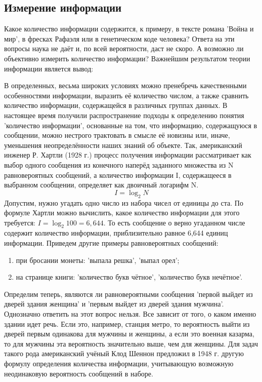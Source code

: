 \documentclass[a4paper]{article}
\begin{document}
\subsection{Измерение информации}

Какое количество информации содержится, к примеру, в тексте романа 'Война и мир', в фресках Рафаэля или в генетическом коде человека? Ответа на эти вопросы наука не даёт и, по всей вероятности, даст не скоро. А возможно ли объективно измерить количество информации? Важнейшим результатом теории информации является вывод:

В определенных, весьма широких условиях можно пренебречь качественными особенностями информации, выразить её количество числом, а также сравнить количество информации, содержащейся в различных группах данных. В настоящее время получили распространение подходы к определению понятия 'количество информации', основанные на том, что информацию, содержащуюся в сообщении, можно нестрого трактовать в смысле её новизны или, иначе, уменьшения неопределённости наших знаний об объекте.
Так, американский инженер Р. Хартли (1928 г.) процесс получения информации рассматривает как выбор одного сообщения из конечного наперёд заданного множества из N равновероятных сообщений, а количество информации I, содержащееся в выбранном сообщении, определяет как двоичный логарифм N.
\begin{equation}
  I = \log_{2}N
\end{equation}
Допустим, нужно угадать одно число из набора чисел от единицы до ста. По формуле Хартли можно вычислить, какое количество информации для этого требуется: $I=\log_{2}100=6,644$. То есть сообщение о верно угаданном числе содержит количество информации, приблизительно равное 6,644 единиц информации.
Приведем другие примеры равновероятных сообщений:
\begin{enumerate}
\item при бросании монеты: 'выпала решка', 'выпал орел';
\item на странице книги: 'количество букв чётное', 'количество букв нечётное'.
\end{enumerate}

Определим теперь, являются ли равновероятными сообщения 'первой выйдет из дверей здания женщина' и 'первым выйдет из дверей здания мужчина'. Однозначно ответить на этот вопрос нельзя. Все зависит от того, о каком именно здании идет речь. Если это, например, станция метро, то вероятность выйти из дверей первым одинакова для мужчины и женщины, а если это военная казарма, то для мужчины эта вероятность значительно выше, чем для женщины. Для задач такого рода американский учёный Клод Шеннон предложил в 1948 г. другую формулу определения количества информации, учитывающую возможную неодинаковую вероятность сообщений в наборе.
\end{document}
